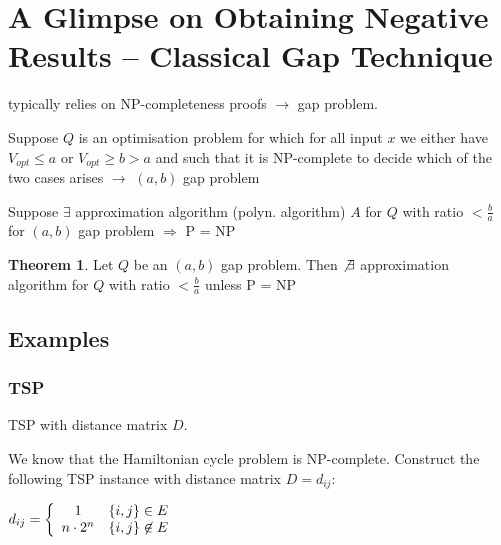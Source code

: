 \documentclass[11pt]{article}
\theoremstyle{definition}
\newtheorem{theorem}{Theorem}[section]
\theoremstyle{definition}
\begin{document}
\section{A Glimpse on Obtaining Negative Results – Classical Gap Technique}

typically relies on NP-completeness proofs $ \rightarrow $ gap problem. \newline

Suppose $ Q $ is an optimisation problem for which for all input $ x $ we either have $ V_{opt} \leq a $ or $ V_{opt} \geq b > a $ and such that it is NP-complete to decide which of the two cases arises $ \rightarrow $ $(a, b) $ gap problem

Suppose $ \exists $ approximation algorithm (polyn. algorithm) $ A $ for $ Q $ with ratio $ < \frac{b}{a} $ for $(a, b) $ gap problem $ \Rightarrow $ P = NP

\begin{theorem}

Let $ Q $ be an $ (a, b) $ gap problem. Then $ \not \exists $ approximation algorithm for $ Q $ with ratio $ < \frac{b}{a} $ unless P = NP

\end{theorem}

\subsection{Examples}
\subsubsection{TSP}

TSP with distance matrix $ D $.

We know that the Hamiltonian cycle problem is NP-complete. Construct the following TSP instance with distance matrix $ D = d_{ij} $:

$ d_{ij} = \left \{ \begin{array}{c l} 1 & \{i, j\} \in E \\ n \cdot 2^n & \{i, j\} \not \in E \end{array} \right. $
\end{document}
